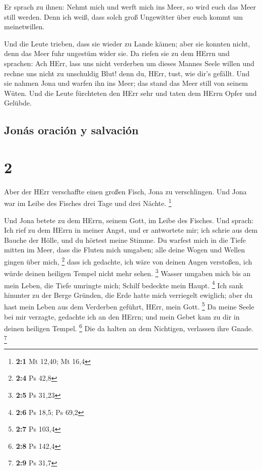  Er sprach zu ihnen: Nehmt mich und werft mich ins Meer,
so wird euch das Meer still werden. Denn ich weiß, dass solch groß
Ungewitter über euch kommt um meinetwillen.

 Und die Leute trieben, dass sie wieder zu Lande kämen;
aber sie konnten nicht, denn das Meer fuhr ungestüm wider sie.
 Da riefen sie zu dem HErrn und sprachen: Ach HErr, lass
uns nicht verderben um dieses Mannes Seele willen und rechne uns nicht
zu unschuldig Blut! denn du, HErr, tust, wie dir's gefällt.
 Und sie nahmen Jona und warfen ihn ins Meer; das stand
das Meer still von seinem Wüten.  Und die Leute
fürchteten den HErr sehr und taten dem HErrn Opfer und Gelübde.

\hypertarget{jonuxe1s-oraciuxf3n-y-salvaciuxf3n}{%
\subsection{Jonás oración y
salvación}\label{jonuxe1s-oraciuxf3n-y-salvaciuxf3n}}

\hypertarget{section-1}{%
\section{2}\label{section-1}}

 Aber der HErr verschaffte einen großen Fisch, Jona zu
verschlingen. Und Jona war im Leibe des Fisches drei Tage und drei
Nächte. \footnote{\textbf{2:1} Mt 12,40; Mt 16,4}

 Und Jona betete zu dem HErrn, seinem Gott, im Leibe des
Fisches.  Und sprach: Ich rief zu dem HErrn in meiner
Angst, und er antwortete mir; ich schrie aus dem Bauche der Hölle, und
du hörtest meine Stimme.  Du warfest mich in die Tiefe
mitten im Meer, dass die Fluten mich umgaben; alle deine Wogen und
Wellen gingen über mich, \footnote{\textbf{2:4} Ps 42,8} 
dass ich gedachte, ich wäre von deinen Augen verstoßen, ich würde deinen
heiligen Tempel nicht mehr sehen. \footnote{\textbf{2:5} Ps 31,23}
 Wasser umgaben mich bis an mein Leben, die Tiefe umringte
mich; Schilf bedeckte mein Haupt. \footnote{\textbf{2:6} Ps 18,5; Ps
  69,2}  Ich sank hinunter zu der Berge Gründen, die Erde
hatte mich verriegelt ewiglich; aber du hast mein Leben aus dem
Verderben geführt, HErr, mein Gott. \footnote{\textbf{2:7} Ps 103,4}
 Da meine Seele bei mir verzagte, gedachte ich an den
HErrn; und mein Gebet kam zu dir in deinen heiligen Tempel. \footnote{\textbf{2:8}
  Ps 142,4}  Die da halten an dem Nichtigen, verlassen
ihre Gnade. \footnote{\textbf{2:9} Ps 31,7}

